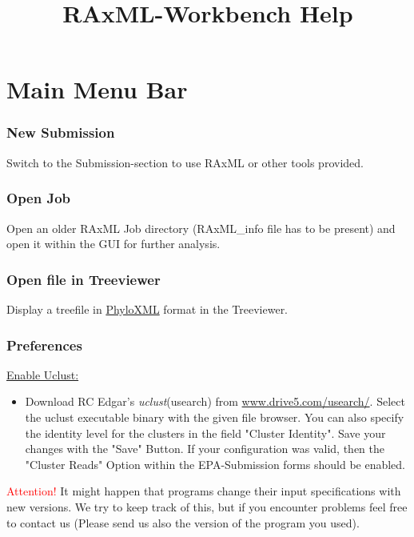 \documentclass{article}
\begin{document}

\title{RAxML-Workbench Help}

\date{}
\maketitle
\tableofcontents

\section{Main Menu Bar}
	\subsubsection*{New Submission}Switch to the Submission-section to use RAxML or other tools provided.
    \subsubsection*{Open Job}Open an older RAxML Job directory (RAxML\_info file has to be present) and open it within the GUI for further analysis.
    \subsubsection*{Open file in Treeviewer}Display a treefile in \underline{PhyloXML} format in the Treeviewer.
    \subsubsection*{Preferences} 
   		 \underline{Enable Uclust:}
 		\begin{itemize}
 			\item[] Download RC Edgar's \textit{uclust}(usearch) from \href{www.drive5.com/usearch/}{www.drive5.com/usearch/}. Select the uclust executable binary with the given file browser. You can also specify the identity level for the clusters in the field "Cluster Identity". Save your changes with the "Save" Button. If your configuration was valid, then the "Cluster Reads" Option within the EPA-Submission forms should be enabled.
 		\end{itemize}
 		\textcolor{red}{Attention!} It might happen that programs change their input specifications with new versions. We try to keep track of this, but if you encounter problems feel free to contact us (Please send us also the version of the program you used).
\end{document}
